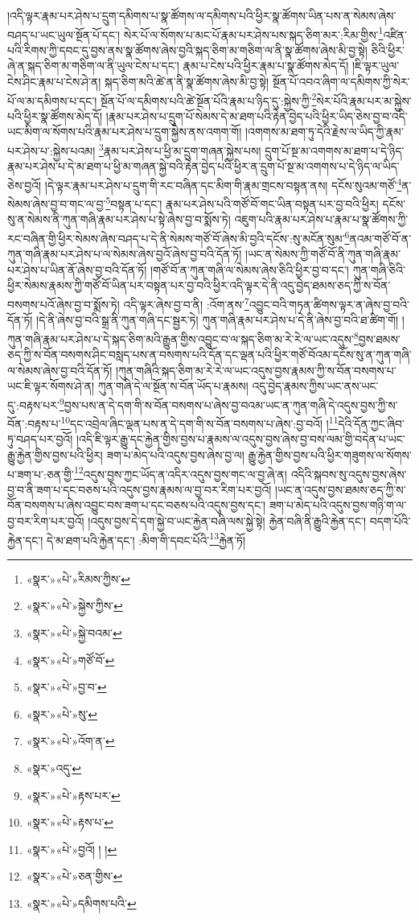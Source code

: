 །འདི་ལྟར་རྣམ་པར་ཤེས་པ་དྲུག་དམིགས་པ་སྣ་ཚོགས་ལ་དམིགས་པའི་ཕྱིར་སྣ་ཚོགས་ཡིན་པས་ན་སེམས་ཞེས་བཤད་པ་ཡང་ཡུལ་སྔོན་པོ་དང་། སེར་པོ་ལ་སོགས་པ་མང་པོ་རྣམ་པར་ཤེས་པས་སྐད་ཅིག་མར་:རིམ་གྱིས་\footnote{«སྣར་»«པེ་»རིམས་ཀྱིས་}འཛིན་པའི་རིགས་ཀྱི་དབང་དུ་བྱས་ནས་སྣ་ཚོགས་ཞེས་བྱའི་སྐད་ཅིག་མ་གཅིག་ལ་ནི་སྣ་ཚོགས་ཞེས་མི་བྱ་སྟེ། ཅིའི་ཕྱིར་ཞེ་ན་སྐད་ཅིག་མ་གཅིག་ལ་ནི་ཡུལ་ངེས་པ་དང་། རྣམ་པ་ངེས་པའི་ཕྱིར་རྣམ་པ་སྣ་ཚོགས་མེད་དོ། །ཇི་ལྟར་ཡུལ་ངེས་ཤིང་རྣམ་པ་ངེས་ཤེ་ན། སྐད་ཅིག་མའི་ཚེ་ན་ནི་སྣ་ཚོགས་ཞེས་མི་བྱ་སྟེ། སྔོན་པོ་འབའ་ཞིག་ལ་དམིགས་ཀྱི་སེར་པོ་ལ་མ་དམིགས་པ་དང་། སྔོན་པོ་ལ་དམིགས་པའི་ཚེ་སྔོན་པོའི་རྣམ་པ་ཉིད་དུ་:སྐྱེས་ཀྱི་\footnote{«སྣར་»«པེ་»སྐྱེས་ཀྱིས་}སེར་པོའི་རྣམ་པར་མ་སྐྱེས་པའི་ཕྱིར་སྣ་ཚོགས་མེད་དོ། །རྣམ་པར་ཤེས་པ་དྲུག་པོ་སེམས་དེ་མ་ཐག་པའི་རྟེན་བྱེད་པའི་ཕྱིར་ཡིད་ཅེས་བྱ་བ་འདི་ཡང་མིག་ལ་སོགས་པའི་རྣམ་པར་ཤེས་པ་དྲུག་སྐྱེས་ནས་འགག་གོ། །འགགས་མ་ཐག་ཏུ་དེའི་རྗེས་ལ་ཡིད་ཀྱི་རྣམ་པར་ཤེས་པ་:སྐྱེས་པའམ། \footnote{«སྣར་»«པེ་»སྐྱེ་བའམ་}རྣམ་པར་ཤེས་པ་ཕྱི་མ་དྲུག་གཞན་སྐྱེས་པས། དྲུག་པོ་སྔ་མ་འགགས་མ་ཐག་པ་དེ་ཉིད་རྣམ་པར་ཤེས་པ་དེ་མ་ཐག་པ་ཕྱི་མ་གཞན་སྐྱེ་བའི་རྟེན་བྱེད་པའི་ཕྱིར་ན་དྲུག་པོ་སྔ་མ་འགགས་པ་དེ་ཉིད་ལ་ཡིད་ཅེས་བྱའོ། །དེ་ལྟར་རྣམ་པར་ཤེས་པ་དྲུག་གི་རང་བཞིན་དང་མིག་གི་རྣམ་གྲངས་བསྟན་ནས། དངོས་སུའམ་གཙོ་\footnote{«སྣར་»«པེ་»གཙོ་བོ་}ན་སེམས་ཞེས་བྱ་བ་གང་ལ་བྱ་\footnote{«སྣར་»«པེ་»བྱ་བ་}བསྟན་པ་དང་། རྣམ་པར་ཤེས་པའི་གཙོ་བོ་གང་ཡིན་བསྟན་པར་བྱ་བའི་ཕྱིར། དངོས་སུ་ན་སེམས་ནི་ཀུན་གཞི་རྣམ་པར་ཤེས་པ་སྟེ་ཞེས་བྱ་བ་སྨོས་ཏེ། འཇུག་པའི་རྣམ་པར་ཤེས་པ་རྣམ་པ་སྣ་ཚོགས་ཀྱི་རང་བཞིན་གྱི་ཕྱིར་སེམས་ཞེས་བཤད་པ་དེ་ནི་སེམས་གཙོ་བོ་ཞེས་མི་བྱའི་དངོས་:སུ་མངོན་སུམ་\footnote{«སྣར་»«པེ་»སུ་}ནའམ་གཙོ་བོ་ན་ཀུན་གཞི་རྣམ་པར་ཤེས་པ་ལ་སེམས་ཞེས་བྱའོ་ཞེས་བྱ་བའི་དོན་ཏོ། །ཡང་ན་སེམས་ཀྱི་གཙོ་བོ་ནི་ཀུན་གཞི་རྣམ་པར་ཤེས་པ་ཡིན་ནོ་ཞེས་བྱ་བའི་དོན་ཏོ། །གཙོ་བོ་ན་ཀུན་གཞི་ལ་སེམས་ཞེས་ཅིའི་ཕྱིར་བྱ་བ་དང་། ཀུན་གཞི་ཅིའི་ཕྱིར་སེམས་རྣམས་ཀྱི་གཙོ་བོ་ཡིན་པར་བསྟན་པར་བྱ་བའི་ཕྱིར་འདི་ལྟར་དེ་ནི་འདུ་བྱེད་ཐམས་ཅད་ཀྱི་ས་བོན་བསགས་པའོ་ཞེས་བྱ་བ་སྨོས་ཏེ། འདི་ལྟར་ཞེས་བྱ་བ་ནི། :འོག་ནས་\footnote{«སྣར་»«པེ་»འོག་ན་}འབྱུང་བའི་གཏན་ཚིགས་ལྟར་ན་ཞེས་བྱ་བའི་དོན་ཏོ། །དེ་ནི་ཞེས་བྱ་བའི་སྒྲ་ནི་ཀུན་གཞི་དང་སྦྱར་ཏེ། ཀུན་གཞི་རྣམ་པར་ཤེས་པ་དེ་ནི་ཞེས་བྱ་བའི་ཐ་ཚིག་གོ། །ཀུན་གཞི་རྣམ་པར་ཤེས་པ་དེ་སྐད་ཅིག་མའི་རྒྱུན་གྱིས་འབྱུང་བ་ལ་སྐད་ཅིག་མ་རེ་རེ་ལ་ཡང་འདུས་\footnote{«སྣར་»འདུ་}བྱས་ཐམས་ཅད་ཀྱི་ས་བོན་བསགས་ཤིང་བསླད་པས་ན་བསགས་པའི་དོན་དང་ལྡན་པའི་ཕྱིར་གཙོ་བོའམ་དངོས་སུ་ན་ཀུན་གཞི་ལ་སེམས་ཞེས་བྱ་བའི་དོན་ཏོ། །ཀུན་གཞིའི་སྐད་ཅིག་མ་རེ་རེ་ལ་ཡང་འདུས་བྱས་རྣམས་ཀྱི་ས་བོན་བསགས་པ་ཡང་ཇི་ལྟར་སོགས་ཤེ་ན། ཀུན་གཞི་དེ་ལ་སྔོན་ས་བོན་ཡོད་པ་རྣམས། འདུ་བྱེད་རྣམས་ཀྱིས་ཡང་ནས་ཡང་དུ་:བརྟས་པར་\footnote{«སྣར་»«པེ་»རྟས་པར་}བྱས་པས་ན་དེ་དག་གི་ས་བོན་བསགས་པ་ཞེས་བྱ་བའམ་ཡང་ན་ཀུན་གཞི་དེ་འདུས་བྱས་ཀྱི་ས་བོན་:བརྟས་པ་\footnote{«སྣར་»«པེ་»རྟས་པ་}དང་འབྲེལ་ཞིང་ལྡན་པས་ན་དེ་དག་གི་ས་བོན་བསགས་པ་ཞེས་:བྱ་བའོ། །\footnote{«སྣར་»«པེ་»བྱའོ། ། །}དེའི་དོན་ཀྱང་ཞིབ་ཏུ་བཤད་པར་བྱའོ། །འདི་ཇི་ལྟར་རྒྱུ་དང་རྐྱེན་གྱིས་བྱས་པ་རྣམས་ལ་འདུས་བྱས་ཞེས་བྱ་བས་ལམ་གྱི་བདེན་པ་ཡང་རྒྱུ་རྐྱེན་གྱིས་བྱས་པའི་ཕྱིར། ཟག་པ་མེད་པའི་འདུས་བྱས་ཞེས་བྱ་ལ། རྒྱུ་རྐྱེན་གྱིས་བྱས་པའི་ཕྱིར་གཟུགས་ལ་སོགས་པ་ཟག་པ་:ཅན་གྱི་\footnote{«སྣར་»«པེ་»ཅན་གྱིས་}འདུས་བྱས་ཀྱང་ཡོད་ན་འདིར་འདུས་བྱས་གང་ལ་བྱ་ཞེ་ན། འདིའི་སྐབས་སུ་འདུས་བྱས་ཞེས་བྱ་བ་ནི་ཟག་པ་དང་བཅས་པའི་འདུས་བྱས་རྣམས་ལ་བྱ་བར་རིག་པར་བྱའོ། །ཡང་ན་འདུས་བྱས་ཐམས་ཅད་ཀྱི་ས་བོན་བསགས་པ་ཞེས་འབྱུང་བས་ཟག་པ་དང་བཅས་པའི་འདུས་བྱས་དང་། ཟག་པ་མེད་པའི་འདུས་བྱས་གཉི་ག་ལ་བྱ་བར་རིག་པར་བྱའོ། །འདུས་བྱས་དེ་དག་སྐྱེ་བ་ཡང་རྐྱེན་བཞི་ལས་སྐྱེ་སྟེ། རྐྱེན་བཞི་ནི་རྒྱུའི་རྐྱེན་དང་། བདག་པོའི་རྐྱེན་དང་། དེ་མ་ཐག་པའི་རྐྱེན་དང་། :མིག་གི་དབང་པོའི་\footnote{«སྣར་»«པེ་»དམིགས་པའི་}རྐྱེན་ཏོ། 